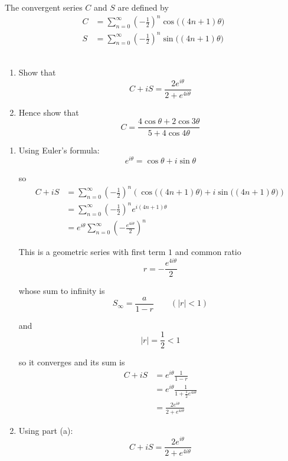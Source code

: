 \documentclass[leqno]{article}
\begin{document}
\begin{enumerate}[
  label=\textbf{\arabic*.},
  leftmargin=*,
  topsep=0pt,
  partopsep=0pt,
  parsep=0pt
]
The convergent series $C$ and $S$ are defined by
\begin{align*}
C &= \sum_{n=0}^{\infty} \left(-\frac{1}{2}\right)^n \cos\bigl((4n+1)\theta\bigr)
\\[10pt]
S &= \sum_{n=0}^{\infty} \left(-\frac{1}{2}\right)^n \sin\bigl((4n+1)\theta\bigr)
\end{align*} \\
\begin{enumerate}[label=\textbf{(\alph*)}]
  \item Show that
  \[
  C + iS = \frac{2e^{i\theta}}{2 + e^{4i\theta}}
  \]
  \item Hence show that
  \[
  C = \frac{4\cos \theta + 2\cos 3\theta}{5 + 4\cos 4\theta}
  \]
\end{enumerate}

\vspace*{10pt}

\begin{djsSolution}
\begin{enumerate}[label=\textbf{(\alph*)}]
  \item Using Euler's formula:
\[
e^{i\theta}=\cos\theta+i\sin\theta
\]

so
\begin{align*}
C+iS
&=\sum_{n=0}^{\infty}\left(-\frac12\right)^n\left(\cos\bigl((4n+1)\theta\bigr)+i\sin\bigl((4n+1)\theta\bigr)\right)\\
&=\sum_{n=0}^{\infty}\left(-\frac12\right)^n e^{i(4n+1)\theta}\\
&=e^{i\theta}\sum_{n=0}^{\infty}\left(-\frac{e^{4i\theta}}{2}\right)^n
\end{align*}

This is a geometric series with first term \(1\) and common ratio
\[
r=-\frac{e^{4i\theta}}{2}
\]

whose sum to infinity is
\[
S_\infty=\dfrac{a}{1-r}\qquad(|r|<1)
\]

and
\[
|r|=\frac12<1
\]

so it converges and its sum is
\begin{align*}
C+iS
&=e^{i\theta}\frac{1}{1-r}\\
&=e^{i\theta}\frac{1}{1+\frac12 e^{4i\theta}}\\
&=\frac{2e^{i\theta}}{2+e^{4i\theta}}
\end{align*}

  \item Using part (a):
\[
C+iS=\frac{2e^{i\theta}}{2+e^{4i\theta}}
\]


\end{enumerate}
\end{djsSolution}
\end{enumerate}
\end{document}
